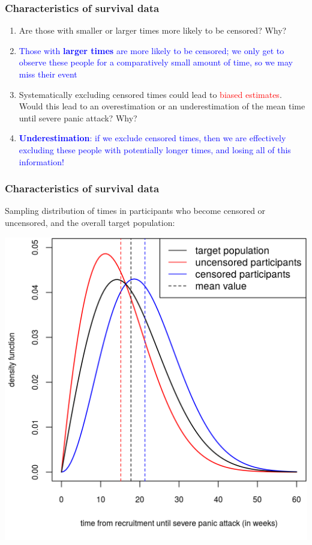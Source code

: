 \documentclass[12pt, 
hyperref={colorlinks=true, linkcolor=blue, urlcolor=cyan},dvipsnames]{beamer}
\begin{document}
\begin{frame}
\frametitle{Characteristics of survival data}
\begin{enumerate}
\item Are those with smaller or larger times more likely to be censored? Why?
\item[] \textcolor{blue}{Those with \textbf{larger times} are more likely to be censored; we only get to observe these people for a comparatively small amount of time, so we may miss their event}
\item Systematically excluding censored times could lead to \textcolor{red}{biased estimates}. Would this lead to an overestimation or an underestimation of the mean time until severe panic attack? Why?
\item[] \textcolor{blue}{\textbf{Underestimation}: if we exclude censored times, then we are effectively excluding these people with potentially longer times, and losing all of this information!}
\end{enumerate}

\end{frame}

\begin{frame}
\frametitle{Characteristics of survival data}
Sampling distribution of times in participants who become censored or uncensored, and the overall target population:\vspace{-0.4cm}
\begin{center}
\includegraphics[height=0.8\textheight]{figs/meditation_density_versus_obs_time.png}
\end{center}
\end{frame}
\end{document}
